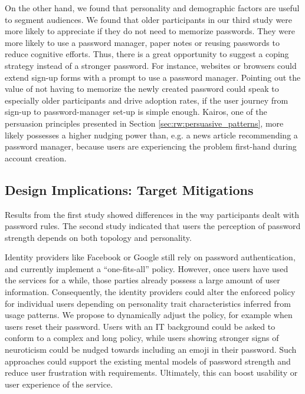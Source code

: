 On the other hand, we found that personality and demographic factors are useful to segment audiences. We found that older participants in our third study were more likely to appreciate if they do not need to memorize passwords. They were more likely to use a password manager, paper notes or reusing passwords to reduce cognitive efforts. Thus, there is a great opportunity to suggest a coping strategy instead of a stronger password. For instance, websites or browsers could extend sign-up forms with a prompt to use a password manager. Pointing out the value of not having to memorize the newly created password could speak to especially older participants and drive adoption rates, if the user journey from sign-up to password-manager set-up is simple enough. Kairos, one of the persuasion principles presented in Section \ref{sec:rw:persuasive_patterns}, more likely possesses a higher nudging power than, e.g. a news article recommending a password manager, because users are experiencing the problem first-hand during account creation. 

\subsection{Design Implications: Target Mitigations}
Results from the first study showed differences in the way participants dealt with password rules. The second study indicated that users the perception of password strength depends on both topology and personality. 

Identity providers like Facebook or Google still rely on password authentication, and currently implement a ``one-fits-all'' policy. However, once users have used the services for a while, those parties already possess a large amount of user information. Consequently, the identity providers could alter the enforced policy for individual users depending on personality trait characteristics inferred from usage patterns. We propose to dynamically adjust the policy, for example when users reset their password. Users with an IT background could be asked to conform to a complex
 and long policy, while users showing stronger signs of neuroticism could be nudged towards including an emoji in their password. Such approaches could support the existing mental models of password strength and reduce user frustration with requirements. Ultimately, this can boost usability or user experience of the service. 
 
 
